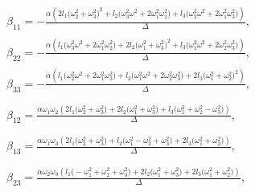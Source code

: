 \begin{equation}

\begin{array} {l}

\displaystyle \beta_{11}=-\frac{\alpha\left(2l_1\big(\omega_2^2+\omega_3^2\big)^2+l_2\big(\omega_3^2\omega^2+2\omega_1^2\omega_2^2\big)+

l_3\big(\omega_2^2\omega^2+2\omega_1^2\omega_3^2\big)\right)}{\Delta},\phantom{\int\limits^{\frac12}}\\

\displaystyle

\beta_{22}=-\frac{\alpha(l_1\big(\omega_3^2\omega^2+2\omega_1^2\omega_2^2\big)+2l_2\big(\omega_1^2+\omega_3^2\big)^2+

l_3\big(\omega_1^2\omega^2+2\omega_2^2\omega_3^2\big))}{\Delta},\phantom{\int\limits^{\frac12}}

\\

\displaystyle

\beta_{33}=-\frac{\alpha(l_1\big(\omega_2^2\omega^2+2\omega_1^2\omega_3^2\big)+l_2\big(\omega_1^2\omega^2+2\omega_2^2\omega_3^2\big)+

2l_3\big(\omega_1^2+\omega_2^2\big)^2)}{\Delta},\phantom{\int\limits^{\frac12}}

\\

\displaystyle

\beta_{12}=\frac{\alpha\omega_1\omega_2(2l_1\big(\omega_2^2+\omega_3^2\big)+2l_2\big(\omega_1^2+\omega_3^2\big)+

l_3\big(\omega_1^2+\omega_2^2-\omega_3^2\big))}{\Delta},\phantom{\int\limits^{\frac12}}

\\

\displaystyle

\beta_{13}=\frac{\alpha\omega_1\omega_3(2l_1\big(\omega_2^2+\omega_3^2\big)+l_2\big(\omega_1^2-\omega_2^2+\omega_3^2\big)+

2l_3\big(\omega_1^2+\omega_2^2\big))}{\Delta},\phantom{\int\limits^{\frac12}}

\\

\displaystyle

\beta_{23}=\frac{\alpha\omega_2\omega_3(l_1\big(-\omega_1^2+\omega_2^2+\omega_3^2\big)+2l_2\big(\omega_1^2+\omega_3^2\big)+

2l_3\big(\omega_1^2+\omega_2^2\big))}{\Delta}, \phantom{\int\limits^{\frac12}}

\end{array}

\label{Zabelin:eq:12}

\end{equation}


